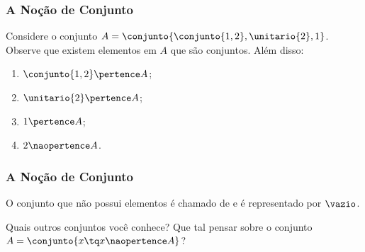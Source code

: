 \begin{frame}
    \frametitle{A Noção de Conjunto}
    
    \begin{exemplo}
        Considere o conjunto $A = \conjunto{\conjunto{1, 2}, \unitario{2}, 1 }$. Observe que existem elementos em $A$ que são conjuntos. Além disso:
        \begin{enumerate}
            \item $\conjunto{1, 2} \pertence A$;
            \item $\unitario{2} \pertence A$;
            \item $1 \pertence A$;
            \item $2 \naopertence A$.
        \end{enumerate}
    \end{exemplo}
\end{frame}


\begin{frame}
    \frametitle{A Noção de Conjunto}

    \begin{definicao}
        O conjunto que não possui elementos é chamado de  e é representado por $\vazio$.
    \end{definicao}

    \begin{exemplo}
        Quais outros conjuntos você conhece? Que tal pensar sobre o conjunto $ A = \conjunto{ x \tq x \naopertence A} $?
    \end{exemplo}
\end{frame}
